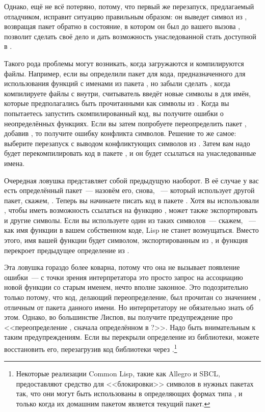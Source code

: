 Однако, ещё не всё потеряно, потому, что первый же перезапуск, предлагаемый отладчиком,
исправит ситуацию правильным образом: он выведет символ  из
, возвращая пакет  обратно в состояние, в котором он
был до вашего вызова , позволит  сделать своё дело и дать
возможность унаследованной  стать доступной в .

Такого рода проблемы могут возникать, когда загружаются и компилируются файлы. Например,
если вы определили пакет  для кода, предназначенного для использования
функций с именами из пакета , но забыли сделать , когда
компилируете файлы с  внутри, считыватель введёт новые символы
в  для имён, которые предполагались быть прочитанными как символы из
. Когда вы попытаетесь запустить скомпилированный код, вы получите ошибки о
неопределённых функциях. Если вы затем попробуете переопределить пакет ,
добавив , то получите ошибку конфликта символов. Решение то же самое:
выберите перезапуск с выводом конфликтующих символов из . Затем вам надо
будет перекомпилировать код в пакете , и он будет ссылаться на унаследованные
имена.

Очередная ловушка представляет собой предыдущую наоборот. В её случае у вас есть
определённый пакет~--- назовём его, снова, ~--- который использует другой
пакет, скажем, . Теперь вы начинаете писать код в пакете . Хотя
вы использовали , чтобы иметь возможность ссылаться на функцию ,
 может также экспортировать и другие символы. Если вы используете один из
таких символов~--- скажем, ~--- как имя функции в вашем собственном коде, Lisp
не станет возмущаться. Вместо этого, имя вашей функции будет символом, экспортированным из
, и функция перекроет предыдущее определение  из .

Эта ловушка гораздо более коварна, потому что она не вызывает появление ошибки~--- с точки
зрения интерпретатора это просто запрос на ассоциацию новой функции со старым именем,
нечто вполне законное. Это подозрительно только потому, что код, делающий переопределение,
был прочитан со значением , отличным от пакета данного имени. Но
интерпретатору не обязательно знать об этом. Однако, во большинстве Лиспов, вы получите
предупреждение про <<переопределение , сначала определённом в ?>>. Надо быть
внимательным к таким предупреждениям. Если вы перекрыли определение из библиотеки, можете
восстановить его, перезагрузив код библиотеки через .\footnote{Некоторые
  реализации Common Lisp, такие как Allegro и SBCL, предоставляют средство для
  <<блокировки>> символов в нужных пакетах так, что они могут быть использованы в
  определяющих формах типа ,  и  только когда их
  домашним пакетом является текущий пакет.}

